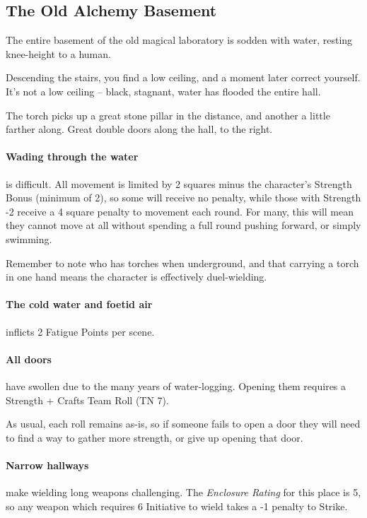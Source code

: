 \begin{multicols}{2}
\subsection{The Old Alchemy Basement}
\label{old_alchemy_basement}

The entire basement of the old magical laboratory is sodden with water, resting knee-height to a human.

\begin{boxtext}
  Descending the stairs, you find a low ceiling, and a moment later correct yourself.  It's not a low ceiling -- black, stagnant, water has flooded the entire hall.

  The torch picks up a great stone pillar in the distance, and another a little farther along.
  Great double doors along the hall, to the right.

\end{boxtext}

\paragraph{Wading through the water}
is difficult.
All movement is limited by 2 squares minus the character's Strength Bonus (minimum of 2), so some will receive no penalty, while those with Strength -2 receive a 4 square penalty to movement each round.
For many, this will mean they cannot move at all without spending a full round pushing forward, or simply swimming.

Remember to note who has torches when underground, and that carrying a torch in one hand means the character is effectively duel-wielding.

\paragraph{The cold water and foetid air}
inflicts 2 Fatigue Points per scene.

\paragraph{All doors}
have swollen due to the many years of water-logging.
Opening them requires a Strength + Crafts Team Roll (TN 7).

As usual, each roll remains as-is, so if someone fails to open a door they will need to find a way to gather more strength, or give up opening that door.

\paragraph{Narrow hallways}
make wielding long weapons challenging.
The \textit{Enclosure Rating} for this place is 5, so any weapon which requires 6 Initiative to wield takes a -1 penalty to Strike.


\end{multicols}
